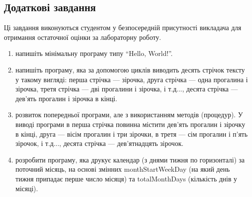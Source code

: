 \subsection{Додаткові завдання}
Ці завдання виконуються студентом у безпосередній присутності викладача для отримання остаточної оцінки за лабораторну роботу.
\begin{enumerate}
\item напишіть мінімальну програму типу ``Hello, World!''.
\item напишіть програму, яка за допомогою циклів виводить десять стрічок тексту у такому вигляді: перша стрічка --- зірочка, друга стрічка --- одна прогалина і зірочка, третя стрічка --- дві прогалини і зірочка, і т.д..., десята стрічка --- дев’ять прогалин і зірочка в кінці.
\item розвиток попередньої програми, але з використанням методів (процедур). У виводі програми в перша стрічка повинна містити дев’ять прогалин і зірочку в кінці, друга --- вісім прогалин і три зірочки, в третя --- сім прогалин і п’ять зірочок, і т.д..., десята стрічка --- дев’ятнадцять зірочок.
\item розробити програму, яка друкує календар (з днями тижня по горизонталі) за поточний місяць, на основі змінних monthStartWeekDay (на який день тижня припадає перше число місяця) та totalMonthDays (кількість днів у місяці). 
\end{enumerate}

